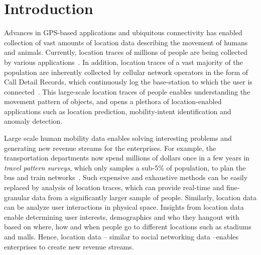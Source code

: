 \section{Introduction}
Advances in GPS-based applications and ubiquitous connectivity has enabled collection of vast amounts of location data describing the movement of humans and animals. Currently, location traces of millions of people are being collected by various applications~\cite{waze}. In addition, location traces of a vast majority of the population are inherently collected by cellular network operators in the form of Call Detail Records, which continuously log the base-station to which the user is connected~\cite{tdrs}. This large-scale location traces of people enables understanding the movement pattern of objects, and opens a plethora of location-enabled applications such as location prediction, mobility-intent identification and anomaly detection. 

Large scale human mobility data enables solving interesting problems and generating new revenue streams for the enterprises. For example, the transportation departments now spend millions of dollars once in a few years in \textit{travel pattern surveys}, which only samples a sub-5\% of population, to plan the bus and train networks~\cite{Richardson1995}. Such expensive and exhaustive methods can be easily replaced by analysis of location traces, which can provide real-time and fine-granular data from a significantly larger sample of people. Similarly, location data can be analyze user interactions in physical space. Insights from location data enable determining user interests, demographics and who they hangout with based on where, how and when people go to different locations such as stadiums and malls. Hence, location data -- similar to social networking data --enables enterprises to create new revenue streams.

